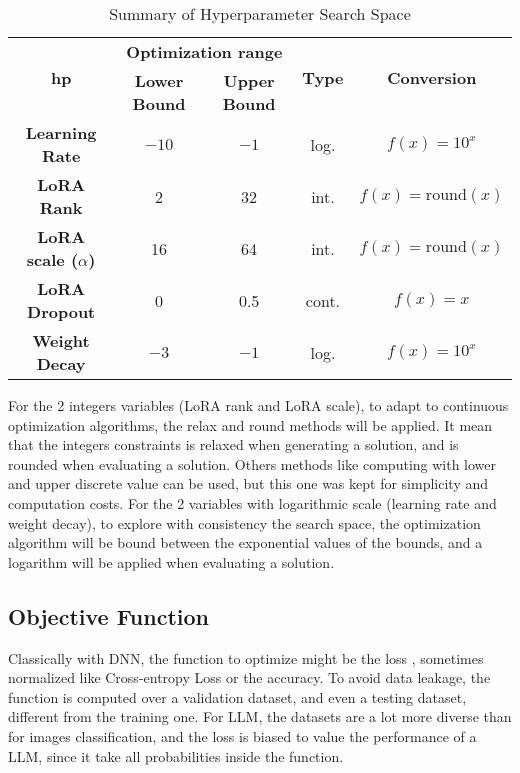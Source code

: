 \vspace*{-\baselineskip}
\begin{table}[h]
    \centering
    \begin{tabular}{|c|c|c|c|c|}
        \hline
        \multirow{2}{*}{\textbf{ \Gls{hp} }} & \multicolumn{2}{|c|}{\textbf{Optimization range}} &\multirow{2}{*}{\textbf{ Type }}& \multirow{2}{*}{\textbf{ Conversion }} \\
        \cline{2-3}
         & \textbf{ Lower Bound } & \textbf{ Upper Bound } &  \\
        \hline
        \textbf{Learning Rate} & $-10$ & $-1$ & log. & $f(x) = 10^{x}$ \\
        \hline
        \textbf{LoRA Rank} & 2 & 32 &int. &$f(x) = \text{round}(x)$ \\
        \hline
        \textbf{LoRA scale ($\alpha$)} & 16 & 64 & int. &$f(x) = \text{round}(x)$ \\
        \hline
        \textbf{LoRA Dropout} & 0 & 0.5 & cont.& $f(x) = x$ \\
        \hline
        \textbf{Weight Decay} & $-3$ & $-1$ &log.& $f(x) = 10^{x}$  \\
        \hline
    \end{tabular}
    \caption{Summary of Hyperparameter Search Space}
    \label{tab:hyperparam_table}
\end{table}\vspace*{-\baselineskip}

For the 2 integers variables (LoRA rank and LoRA scale), to adapt to continuous optimization algorithms, the relax and round methods will be applied. It mean that the integers constraints is relaxed when generating a solution, and is rounded when evaluating a solution. Others methods like computing with lower and upper discrete value can be used, but this one was kept for simplicity and computation costs.
For the 2 variables with logarithmic scale (learning rate and weight decay), to explore with consistency the search space, the optimization algorithm will be bound between the exponential values of the bounds, and a logarithm will be applied when evaluating a solution.


\subsection{Objective Function}
\label{sec:obj_fun}
Classically with DNN, the function to optimize might be the loss , sometimes normalized like Cross-entropy Loss or the accuracy. To avoid data leakage, the function is computed over a validation dataset, and even a testing dataset, different from the training one. For LLM, the datasets are a lot more diverse than for images classification, and the loss is biased to value the performance of a LLM, since it take all probabilities inside the function. 

